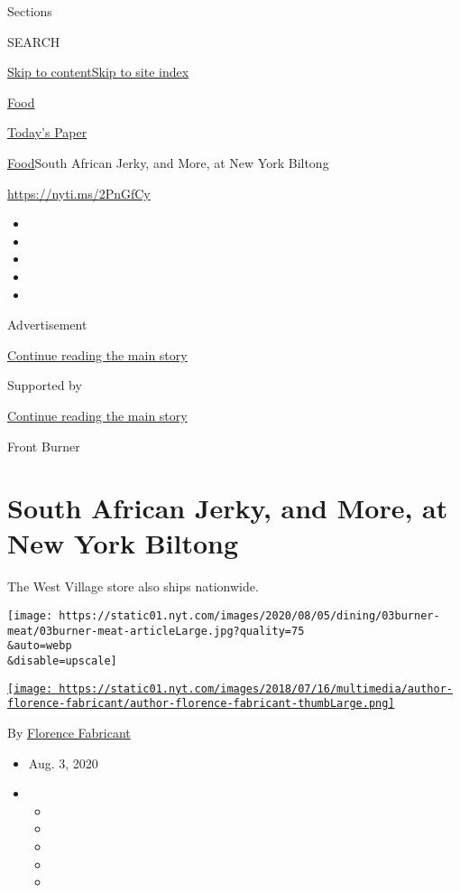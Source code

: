 Sections

SEARCH

\protect\hyperlink{site-content}{Skip to
content}\protect\hyperlink{site-index}{Skip to site index}

\href{https://www.nytimes.com/section/food}{Food}

\href{https://myaccount.nytimes.com/auth/login?response_type=cookie\&client_id=vi}{}

\href{https://www.nytimes.com/section/todayspaper}{Today's Paper}

\href{/section/food}{Food}\textbar{}South African Jerky, and More, at
New York Biltong

\url{https://nyti.ms/2PnGfCy}

\begin{itemize}
\item
\item
\item
\item
\item
\end{itemize}

Advertisement

\protect\hyperlink{after-top}{Continue reading the main story}

Supported by

\protect\hyperlink{after-sponsor}{Continue reading the main story}

Front Burner

\hypertarget{south-african-jerky-and-more-at-new-york-biltong}{%
\section{South African Jerky, and More, at New York
Biltong}\label{south-african-jerky-and-more-at-new-york-biltong}}

The West Village store also ships nationwide.

\texttt{[image: https://static01.nyt.com/images/2020/08/05/dining/03burner-meat/03burner-meat-articleLarge.jpg?quality=75\\\&auto=webp\\\&disable=upscale]}

\href{https://www.nytimes.com/by/florence-fabricant}{\texttt{[image: https://static01.nyt.com/images/2018/07/16/multimedia/author-florence-fabricant/author-florence-fabricant-thumbLarge.png]}}

By \href{https://www.nytimes.com/by/florence-fabricant}{Florence
Fabricant}

\begin{itemize}
\item
  Aug. 3, 2020
\item
  \begin{itemize}
  \item
  \item
  \item
  \item
  \item
  \end{itemize}
\end{itemize}

